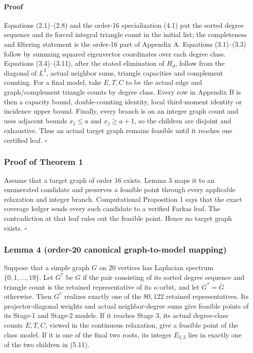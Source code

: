 \documentclass[
  english,
  11pt,
  a4paper,
]{article}
\begin{document}
\paragraph{Proof}\label{proof}

Equations (2.1)--(2.8) and the order-16 specialization (4.1) put the
sorted degree sequence and its forced integral triangle count in the
initial list; the completeness and filtering statement is the order-16
part of Appendix A. Equations (3.1)--(3.3) follow by summing squared
eigenvector coordinates over each degree class. Equations (3.4)--(3.11),
after the stated elimination of \(H_d\), follow from the diagonal of
\(L^3\), actual neighbor sums, triangle capacities and complement
counting. For a final model, take \(E,T,C\) to be the actual edge and
graph/complement triangle counts by degree class. Every row in Appendix
B is then a capacity bound, double-counting identity, local third-moment
identity or incidence upper bound. Finally, every branch is on an
integer graph count and uses adjacent bounds \(x_j\le a\) and
\(x_j\ge a+1\), so the children are disjoint and exhaustive. Thus an
actual target graph remains feasible until it reaches one certified
leaf. \(\square\)

\subsubsection{Proof of Theorem 1}\label{proof-of-theorem-1}

Assume that a target graph of order 16 exists. Lemma 3 maps it to an
enumerated candidate and preserves a feasible point through every
applicable relaxation and integer branch. Computational Proposition 1
says that the exact coverage ledger sends every such candidate to a
verified Farkas leaf. The contradiction at that leaf rules out the
feasible point. Hence no target graph exists. \(\square\)

\subsubsection{Lemma 4 (order-20 canonical graph-to-model
mapping)}\label{lemma-4-order-20-canonical-graph-to-model-mapping}

Suppose that a simple graph \(G\) on \(20\) vertices has Laplacian
spectrum \(\{0,1,\ldots,19\}\). Let \(G^{\ast}\) be \(G\) if the pair
consisting of its sorted degree sequence and triangle count is the
retained representative of its \(\kappa\)-orbit, and let
\(G^{\ast}=\overline G\) otherwise. Then \(G^{\ast}\) realizes exactly
one of the \(80{,}122\) retained representatives. Its projector-diagonal
weights and actual neighbor-degree sums give feasible points of its
Stage-1 and Stage-2 models. If it reaches Stage 3, its actual
degree-class counts \(E,T,C\), viewed in the continuous relaxation, give
a feasible point of the class model. If it is one of the final two
roots, its integer \(E_{2,2}\) lies in exactly one of the two children
in (5.11).
\end{document}
